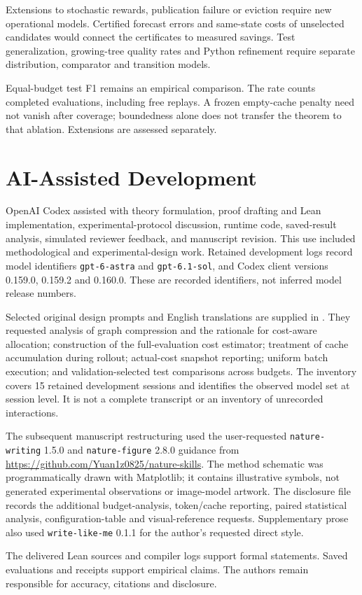 Extensions to stochastic rewards, publication failure or eviction require
new operational models. Certified forecast errors and same-state costs of
unselected candidates would connect the certificates to measured savings.
Test generalization, growing-tree quality rates and Python refinement require
separate distribution, comparator and transition models.

Equal-budget test F1 remains an empirical comparison. The rate counts
completed evaluations, including free replays. A frozen empty-cache penalty
need not vanish after coverage; boundedness alone does not transfer the
theorem to that ablation. Extensions are assessed separately.
\section{AI-Assisted Development}

\label{app:ai-assistance}
OpenAI Codex assisted with theory formulation, proof drafting and Lean
implementation, experimental-protocol discussion, runtime code, saved-result
analysis, simulated reviewer feedback, and manuscript revision. This use
included methodological and experimental-design work. Retained development
logs record model identifiers \texttt{gpt-6-astra} and
\texttt{gpt-6.1-sol}, and Codex client versions 0.159.0, 0.159.2 and 0.160.0.
These are recorded identifiers, not inferred model release numbers.

Selected original design prompts and English translations are supplied in
.
They requested analysis of graph compression and the rationale for cost-aware
allocation; construction of the full-evaluation cost estimator; treatment of
cache accumulation during rollout; actual-cost snapshot reporting; uniform
batch execution; and validation-selected test comparisons across budgets.
The inventory covers 15 retained development sessions and identifies the
observed model set at session level. It is not a complete transcript or an
inventory of unrecorded interactions.

The subsequent manuscript restructuring used the user-requested
\texttt{nature-writing} 1.5.0 and \texttt{nature-figure} 2.8.0 guidance from
\url{https://github.com/Yuan1z0825/nature-skills}. The method schematic was
programmatically drawn with Matplotlib; it contains illustrative symbols,
not generated experimental observations or image-model artwork. The disclosure
file records the additional budget-analysis, token/cache reporting, paired
statistical analysis, configuration-table and visual-reference requests.
Supplementary prose also used \texttt{write-like-me} 0.1.1 for the author's
requested direct style.

The delivered Lean sources and compiler logs support formal statements.
Saved evaluations and receipts support empirical claims. The authors remain
responsible for accuracy, citations and disclosure.

